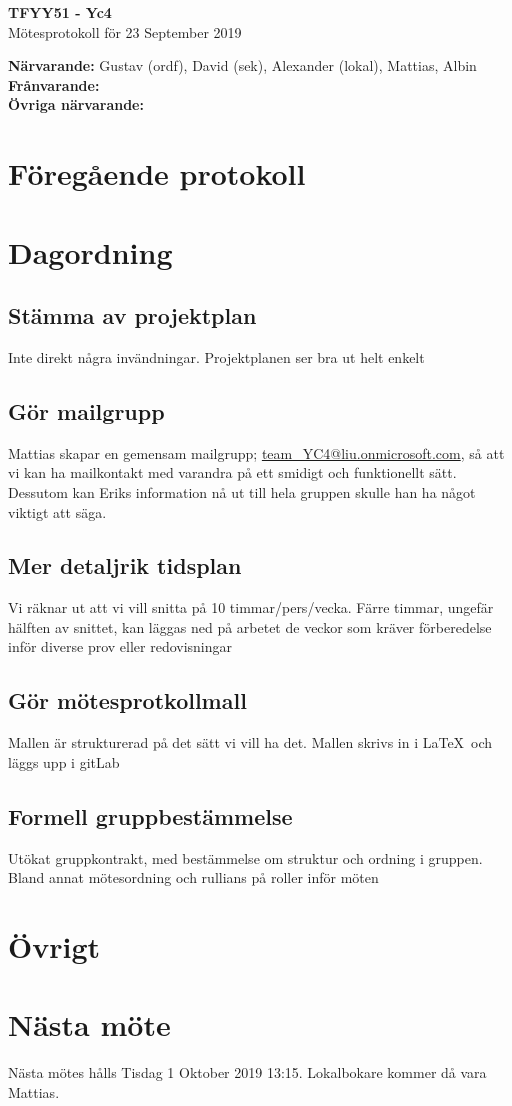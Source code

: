 \documentclass[11pt,a4paper]{article}
\begin{document}
    \begin{center}
        \textbf{\Large TFYY51 - Yc4} \\[0.2em]
        Mötesprotokoll för 23 September 2019
    \end{center}
    \vspace{1em}
    \textbf{Närvarande:} Gustav (ordf), David (sek), Alexander (lokal), Mattias, Albin \\[0.5em]
    \textbf{Frånvarande:} \\[0.5em]  %
    \textbf{Övriga närvarande:}

    \section*{Föregående protokoll}
    \vspace{1em}
    
    \section*{Dagordning}
    \subsection*{Stämma av projektplan}
    Inte direkt några invändningar. Projektplanen ser bra ut helt enkelt
    \subsection*{Gör mailgrupp}
    Mattias skapar en gemensam mailgrupp; \url{team_YC4@liu.onmicrosoft.com}, så att vi kan ha mailkontakt med varandra på ett smidigt och funktionellt sätt.
    Dessutom kan Eriks information nå ut till hela gruppen skulle han ha något viktigt att säga.
    \subsection*{Mer detaljrik tidsplan}
    Vi räknar ut att vi vill snitta på 10 timmar/pers/vecka. Färre timmar, ungefär hälften av snittet, kan läggas ned på arbetet de veckor som kräver förberedelse inför diverse
    prov eller redovisningar
    \subsection*{Gör mötesprotkollmall}
    Mallen är strukturerad på det sätt vi vill ha det. Mallen skrivs in i \LaTeX\ och läggs upp i gitLab
    \subsection*{Formell gruppbestämmelse}
    Utökat gruppkontrakt, med bestämmelse om struktur och ordning i gruppen. Bland annat mötesordning och rullians på roller inför möten

    \section*{Övrigt}
    \vspace{1em}

    \section*{Nästa möte}
    Nästa mötes hålls Tisdag 1 Oktober 2019 13:15. Lokalbokare kommer då vara Mattias.  
\end{document}
